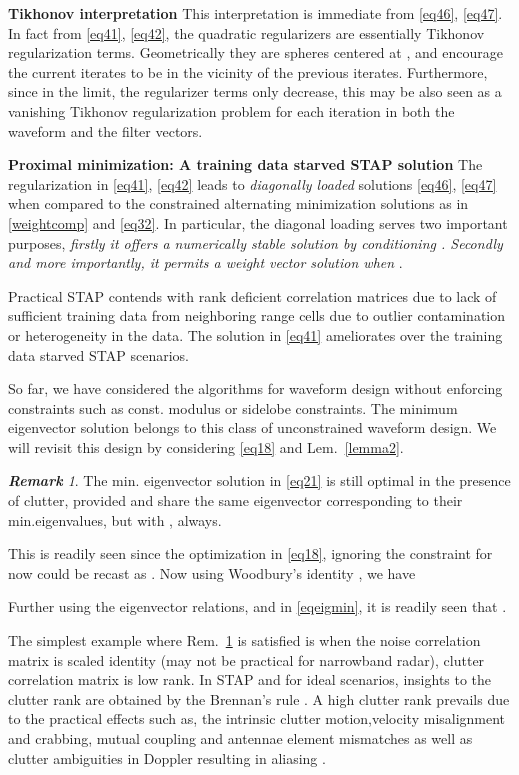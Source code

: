 \documentclass[11pt,draftclsnofoot,onecolumn]{IEEEtran}
\theoremstyle{definition}
\theoremstyle{remark}
\newtheorem{remk}{\bf Remark}
\begin{document}
{\bf Tikhonov interpretation} This interpretation is immediate from \eqref{eq46}, \eqref{eq47}. In fact from \eqref{eq41}, \eqref{eq42},  the quadratic  regularizers  are essentially Tikhonov regularization terms. Geometrically they are spheres centered at ,  and encourage the current iterates to be in the vicinity of the previous iterates. Furthermore, since in the limit, the regularizer terms only decrease, this may be also seen as a vanishing Tikhonov regularization problem \cite{Parikh2013} for each iteration in both the waveform and the filter vectors.

{\bf Proximal minimization: A training data starved STAP solution} The regularization in \eqref{eq41}, \eqref{eq42} leads to {\it diagonally loaded} solutions \eqref{eq46}, \eqref{eq47} when compared to the constrained alternating minimization solutions as in \eqref{weightcomp} and \eqref{eq32}. In particular, the diagonal loading serves two important purposes, {\it firstly it offers a numerically stable solution by conditioning . Secondly and more importantly, it permits a weight vector solution when }.   

Practical STAP contends with rank deficient correlation matrices due to lack of sufficient training data from neighboring range cells due to outlier contamination or heterogeneity in the data. The solution in \eqref{eq41} ameliorates over the training data starved STAP scenarios.

So far, we have considered the algorithms for waveform design without enforcing constraints such as const. modulus or sidelobe constraints. The minimum eigenvector solution belongs to this class of unconstrained waveform design. We will revisit this design by considering \eqref{eq18} and Lem.~\ref{lemma2}.
\begin{remk} \label{remark5}
The min. eigenvector solution in \eqref{eq21} is still optimal in the presence of clutter, provided  and  share the same eigenvector corresponding to their min.eigenvalues, but with , always.
\end{remk}

This is readily seen since the optimization in \eqref{eq18}, ignoring the constraint for now could be recast as .  Now using Woodbury's identity \cite{Kayest1998}, we have

Further using the eigenvector relations,  and  in \eqref{eqeigmin}, it is readily seen that .

The simplest example where Rem.~\ref{remark5} is satisfied is when the noise correlation matrix is scaled identity (may not be practical for narrowband radar), clutter correlation matrix is low rank. In STAP and for ideal scenarios, insights to the clutter rank are obtained by the Brennan's rule \cite{guerci2003,klemm2002,ward1994}. A high clutter rank prevails due to the practical effects such as, the intrinsic clutter motion,velocity misalignment and crabbing, mutual coupling and antennae element mismatches as well as clutter ambiguities in Doppler resulting in aliasing \cite{ward1994}. 
\end{document}
